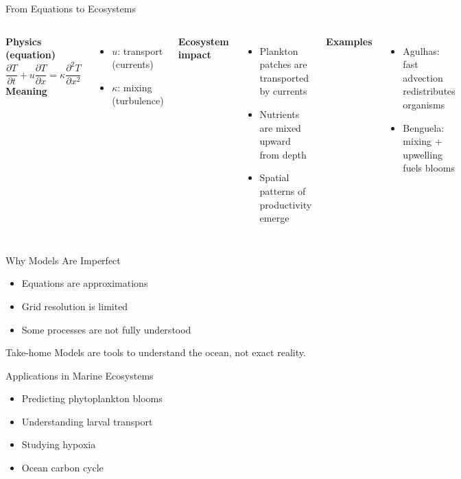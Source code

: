 \documentclass[english,aspectratio=169]{beamer}
\begin{document}
\begin{frame}{From Equations to Ecosystems}
\begin{columns}
\textbf{Physics (equation)}
\[
\frac{\partial T}{\partial t} + u \frac{\partial T}{\partial x} = \kappa \frac{\partial^2 T}{\partial x^2}
\]
\vspace{0.3cm}
\textbf{Meaning}
\begin{itemize}
\item $u$: transport (currents)
\item $\kappa$: mixing (turbulence)
\end{itemize}
\textbf{Ecosystem impact}
\begin{itemize}
\item Plankton patches are transported by currents
\item Nutrients are mixed upward from depth
\item Spatial patterns of productivity emerge
\end{itemize}
\vspace{0.3cm}
\textbf{Examples}
\begin{itemize}
\item Agulhas: fast advection redistributes organisms
\item Benguela: mixing + upwelling fuels blooms
\end{itemize}
\end{columns}
\end{frame}
\begin{frame}{Why Models Are Imperfect}
\begin{itemize}
\item Equations are approximations
\item Grid resolution is limited
\item Some processes are not fully understood
\end{itemize}

\begin{block}{Take-home}
Models are tools to understand the ocean, not exact reality.
\end{block}
\end{frame}

\begin{frame}{Applications in Marine Ecosystems}
\begin{itemize}
\item Predicting phytoplankton blooms
\item Understanding larval transport
\item Studying hypoxia
\item Ocean carbon cycle
\end{itemize}
\end{frame}
\end{document}
